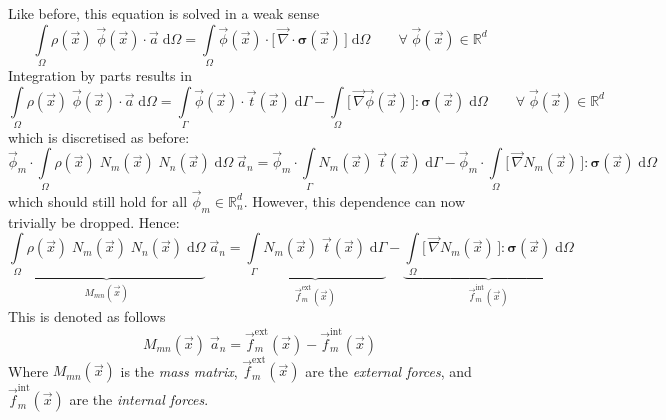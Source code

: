 \documentclass[times,namecite]{goose-article}
\begin{document}
Like before, this equation is solved in a weak sense
\begin{equation}
  \int\limits_\Omega
    \rho(\vec{x})\; \vec{\phi}(\vec{x}) \cdot \vec{a} \;
  \mathrm{d}\Omega
  =
  \int\limits_\Omega
    \vec{\phi}(\vec{x})
    \cdot
    \Big[\,
      \vec{\nabla}
      \cdot
      \bm{\sigma}(\vec{x})
    \,\Big] \;
  \mathrm{d}\Omega
  \qquad
  \forall \; \vec{\phi}(\vec{x}) \in \mathbb{R}^d
\end{equation}
Integration by parts results in
\begin{equation}
  \int\limits_\Omega
    \rho(\vec{x})\; \vec{\phi}(\vec{x}) \cdot \vec{a} \;
  \mathrm{d}\Omega
  =
  \int\limits_\Gamma
    \vec{\phi}(\vec{x}) \cdot \vec{t}(\vec{x}) \;
  \mathrm{d}\Gamma
  -
  \int\limits_\Omega
    \big[\, \vec{\nabla} \vec{\phi}(\vec{x}) \,\big]
    :
    \bm{\sigma}(\vec{x}) \;
  \mathrm{d}\Omega
  \qquad
  \forall \; \vec{\phi}(\vec{x}) \in \mathbb{R}^d
\end{equation}
which is discretised as before:
\begin{equation}
  \vec{\phi}_m \cdot
  \int\limits_\Omega
    \rho(\vec{x})\; N_m(\vec{x})\; N_n(\vec{x}) \;
  \mathrm{d}\Omega \;
  \vec{a}_n
  =
  \vec{\phi}_m \cdot
  \int\limits_\Gamma
    N_m(\vec{x})\; \vec{t}(\vec{x}) \;
  \mathrm{d}\Gamma
  -
  \vec{\phi}_m \cdot
  \int\limits_\Omega
    \big[\, \vec{\nabla} N_m(\vec{x}) \,\big]
    :
    \bm{\sigma}(\vec{x}) \;
  \mathrm{d}\Omega
\end{equation}
which should still hold for all $\vec{\phi}_m \in \mathbb{R}^d_n$. However, this dependence can now trivially be dropped. Hence:
\begin{equation}
\label{eq:dynamics:system}
  \underbrace{
    \int\limits_\Omega
      \rho(\vec{x})\; N_m(\vec{x})\; N_n(\vec{x}) \;
    \mathrm{d}\Omega
  }_{\displaystyle
    M_{mn}(\vec{x})
  } \;
  \vec{a}_n
  =
  \underbrace{
    \int\limits_\Gamma
      N_m(\vec{x})\; \vec{t}(\vec{x}) \;
    \mathrm{d}\Gamma
  }_{\displaystyle
    \vec{f}_m^\mathrm{ext}(\vec{x})
  }
  -
  \underbrace{
    \int\limits_\Omega
      \big[\, \vec{\nabla} N_m(\vec{x}) \,\big]
      :
      \bm{\sigma}(\vec{x}) \;
    \mathrm{d}\Omega
  }_{\displaystyle
    \vec{f}_m^\mathrm{int}(\vec{x})
  }
\end{equation}
This is denoted as follows
\begin{equation}
  M_{mn}(\vec{x})\; \vec{a}_n
  =
  \vec{f}_m^\mathrm{ext}(\vec{x})
  -
  \vec{f}_m^\mathrm{int}(\vec{x})
\end{equation}
Where $M_{mn}(\vec{x})$ is the \emph{mass matrix}, $\vec{f}_m^\mathrm{ext}(\vec{x})$ are the \emph{external forces}, and $\vec{f}_m^\mathrm{int}(\vec{x})$ are the \emph{internal forces}.
\end{document}
